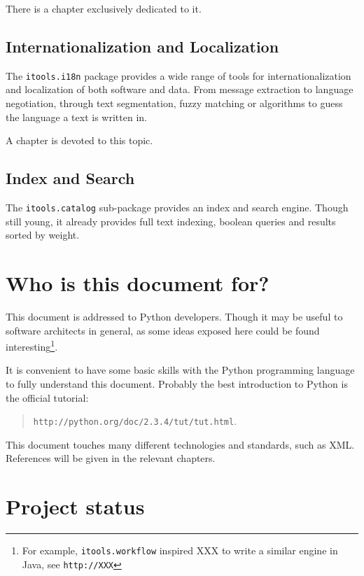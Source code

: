 There is a chapter exclusively dedicated to it.

\subsection{Internationalization and Localization}

The {\tt itools.i18n} package provides a wide range of tools for
internationalization and localization of both software and data. From
message extraction to language negotiation, through text segmentation,
fuzzy matching or algorithms to guess the language a text is written in.

A chapter is devoted to this topic.


\subsection{Index and Search}

The {\tt itools.catalog} sub-package provides an index and search engine.
Though still young, it already provides full text indexing, boolean queries
and results sorted by weight.



\section{Who is this document for?}

This document is addressed to Python developers. Though it may be useful
to software architects in general, as some ideas exposed here could be
found interesting\footnote{For example, {\tt itools.workflow} inspired
XXX to write a similar engine in Java, see {\tt http://XXX}}.

It is convenient to have some basic skills with the Python programming
language to fully understand this document. Probably the best introduction
to Python is the official tutorial:

\begin{quote}
  {\tt http://python.org/doc/2.3.4/tut/tut.html}.
\end{quote}

This document touches many different technologies and standards, such as XML.
References will be given in the relevant chapters.


\section{Project status}

